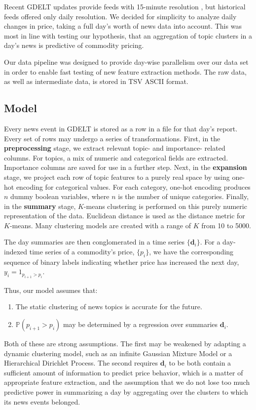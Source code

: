 
Recent GDELT updates provide feeds with 15-minute resolution \cite{GDELT2}, but historical feeds offered only daily resolution. We decided for simplicity to analyze daily changes in price, taking a full day's worth of news data into account. This was most in line with testing our hypothesis, that an aggregation of topic clusters in a day's news is predictive of commodity pricing.

Our data pipeline was designed to provide day-wise parallelism over our data set in order to enable fast testing of new feature extraction methods. The raw data, as well as intermediate data, is stored in TSV ASCII format.

\subsection{Model}

Every news event in GDELT is stored as a row in a file for that day's report. Every set of rows may undergo a series of transformations. First, in the \textbf{preprocessing} stage, we extract relevant topic- and importance- related columns. For topics, a mix of numeric and categorical fields are extracted. Importance columns are saved for use in a further step. Next, in the \textbf{expansion} stage, we project each row of topic features to a purely real space by using one-hot encoding for categorical values. For each category, one-hot encoding produces $n$ dummy boolean variables, where $n$ is the number of unique categories. Finally, in the \textbf{summary} stage, $K$-means clustering is performed on this purely numeric representation of the data. Euclidean distance is used as the distance metric for $K$-means. Many clustering models are created with a range of $K$ from 10 to 5000.

The day summaries are then conglomerated in a time series $\{\textbf{d}_i\}$. For a day-indexed time series of a commodity's price, $\{p_i\}$, we have the corresponding sequence of binary labels indicating whether price has increased the next day, $y_i=1_{p_{i+1}>p_i}$.

Thus, our model assumes that:
\begin{enumerate}
\item The static clustering of news topics is accurate for the future.
\item $\mathbb{P}(p_{i+1}>p_i)$ may be determined by a regression over summaries $\textbf{d}_i$. 
\end{enumerate}

Both of these are strong assumptions. The first may be weakened by adapting a dynamic clustering model, such as an infinite Gaussian Mixture Model or a Hierarchical Dirichlet Process. The second requires $\textbf{d}_i$ to be both contain a sufficient amount of information to predict price behavior, which is a matter of appropriate feature extraction, and the assumption that we do not lose too much predictive power in summarizing a day by aggregating over the clusters to which its news events belonged.

